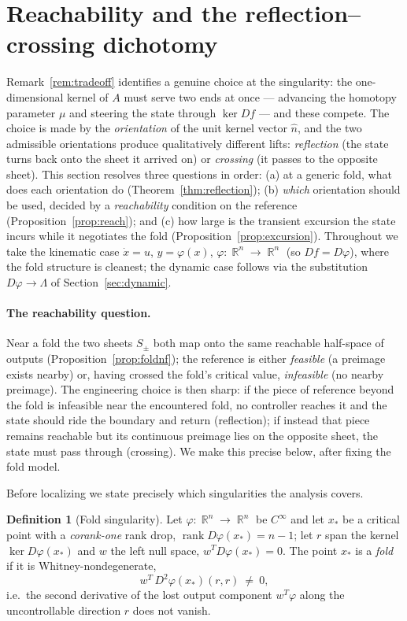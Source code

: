 \documentclass[11pt,american]{article}
\DeclareMathOperator{\R}{\mathbb{R}}
\DeclareMathOperator{\rank}{\operatorname{rank}}
\theoremstyle{definition}
\newtheorem{definition}{Definition}
\theoremstyle{plain}
\theoremstyle{remark}
\begin{document}
\section{Reachability and the reflection--crossing dichotomy}\label{sec:reflection}

Remark~\ref{rem:tradeoff} identifies a genuine choice at the singularity: the one-dimensional kernel of $A$ must serve two ends at once --- advancing the homotopy parameter $\mu$ and steering the state through $\ker Df$ --- and these compete. The choice is made by the \emph{orientation} of the unit kernel vector $\hat n$, and the two admissible orientations produce qualitatively different lifts: \emph{reflection} (the state turns back onto the sheet it arrived on) or \emph{crossing} (it passes to the opposite sheet). This section resolves three questions in order: (a) at a generic fold, what does each orientation do (Theorem~\ref{thm:reflection}); (b) \emph{which} orientation should be used, decided by a \emph{reachability} condition on the reference (Proposition~\ref{prop:reach}); and (c) how large is the transient excursion the state incurs while it negotiates the fold (Proposition~\ref{prop:excursion}). Throughout we take the kinematic case $\dot x = u$, $y = \varphi(x)$, $\varphi:\R^n\to\R^n$ (so $Df = D\varphi$), where the fold structure is cleanest; the dynamic case follows via the substitution $D\varphi \to \Lambda$ of Section~\ref{sec:dynamic}.

\paragraph{The reachability question.} Near a fold the two sheets $S_\pm$ both map onto the same reachable half-space of outputs (Proposition~\ref{prop:foldnf}); the reference is either \emph{feasible} (a preimage exists nearby) or, having crossed the fold's critical value, \emph{infeasible} (no nearby preimage). The engineering choice is then sharp: if the piece of reference beyond the fold is infeasible near the encountered fold, no controller reaches it and the state should ride the boundary and return (reflection); if instead that piece remains reachable but its continuous preimage lies on the opposite sheet, the state must pass through (crossing). We make this precise below, after fixing the fold model.

Before localizing we state precisely which singularities the analysis covers.

\begin{definition}[Fold singularity]\label{def:fold}
Let $\varphi:\R^n\to\R^n$ be $C^\infty$ and let $x_*$ be a critical point with a \emph{corank-one} rank drop, $\rank D\varphi(x_*)=n-1$; let $r$ span the kernel $\ker D\varphi(x_*)$ and $w$ the left null space, $w^TD\varphi(x_*)=0$. The point $x_*$ is a \emph{fold} if it is Whitney-nondegenerate,
\begin{equation}\label{eq:foldnondeg}
w^{T}\,D^{2}\varphi(x_*)(r,r)\ \ne\ 0,
\end{equation}
i.e.\ the second derivative of the lost output component $w^{T}\varphi$ along the uncontrollable direction $r$ does not vanish.
\end{definition}
\end{document}
